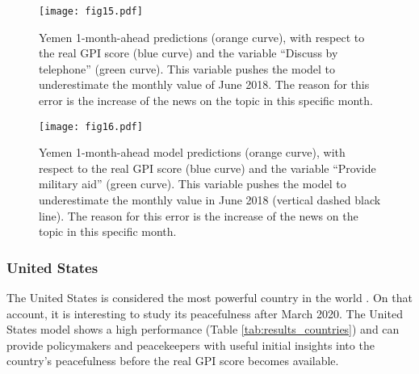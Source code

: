 \documentclass{bmcart}
\begin{document}
\begin{figure}[h!]
\centering
\texttt{[image: fig15.pdf]}
  \caption{
      Yemen 1-month-ahead predictions (orange curve), with respect to the real GPI score (blue curve) and the variable ``Discuss by telephone'' (green curve). This variable pushes the model to underestimate the monthly value of June 2018. The reason for this error is the increase of the news on the topic in this specific month.}
\label{fig:Discussion_YM}
\end{figure}

\begin{figure}[h!]
\centering
\texttt{[image: fig16.pdf]}
  \caption{
      Yemen 1-month-ahead model predictions (orange curve), with respect to the real GPI score (blue curve) and the variable ``Provide military aid'' (green curve). This variable pushes the model to underestimate the monthly value in June 2018  (vertical dashed black line). The reason for this error is the increase of the news on the topic in this specific month.}
\label{fig:Military_aid_YM}
\end{figure}


\subsubsection*{\textbf{United States}}

The United States is considered the most powerful country in the world \cite{cooper2013group}. 
On that account, it is interesting to study its peacefulness after March 2020. The United States model shows a high performance (Table \ref{tab:results_countries}) and can provide policymakers and peacekeepers with useful initial insights into the country's peacefulness before the real GPI score becomes available. 

\end{document}
